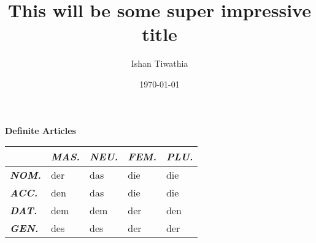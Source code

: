 \documentclass[a4paper,twocolumn,10pt]{article}
\title{This will be some super impressive title}
\author{Ishan Tiwathia}
\date{\today}
\newcommand{\tabularxtable}[3]
{

	\vspace{0.5cm}
	\nolinenumbers

	\begin{tabularx}{#1}{#2}
		#3
	\end{tabularx}

	\linenumbers
	\vspace{0.5cm}
}
\begin{document}
\raggedbottom


\clearpage
\twocolumn






\textbf {Definite Articles}
\tabularxtable
{0.99\linewidth}
{l|XXXX}
{

		&
		\cellcolor{table-subtopic} \textbf{\textit{MAS.}}  &
		\cellcolor{table-subtopic} \textbf{\textit{NEU.}}  &
		\cellcolor{table-subtopic} \textbf{\textit{FEM.}}  &
		\cellcolor{table-subtopic} \textbf{\textit{PLU.}} \\

		\midrule

		\cellcolor{table-subtopic} \textbf{\textit{NOM.}} &
		\cellcolor{cell-lightpurple}  der            &
		\cellcolor{cell-lightorange}  das            &
		\cellcolor{cell-lightblue}    die            &
		\cellcolor{cell-lightblue}    die \\

		\cellcolor{table-subtopic} \textbf{\textit{ACC.}} &
		\cellcolor{cell-lightgreen}   den            &
		\cellcolor{cell-lightorange}  das            &
		\cellcolor{cell-lightblue}    die            &
		\cellcolor{cell-lightblue}    die \\

		\cellcolor{table-subtopic} \textbf{\textit{DAT.}} &
		\cellcolor{cell-lightred}    dem             &
		\cellcolor{cell-lightred}    dem             &
		\cellcolor{cell-lightpurple} der             &
		\cellcolor{cell-lightgreen}  den \\

		\cellcolor{table-subtopic} \textbf{\textit{GEN.}} &
		\cellcolor{cell-lightyellow} des               &
		\cellcolor{cell-lightyellow} des               &
		\cellcolor{cell-lightpurple} der               &
		\cellcolor{cell-lightpurple} der \\



}

\end{document}
